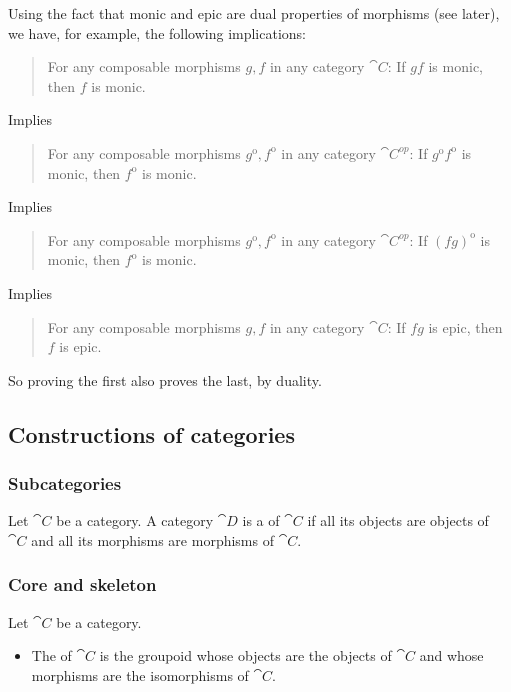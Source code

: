 \begin{example}
Using the fact that monic and epic are dual properties of morphisms (see later), we have, for example, the following implications:
\begin{quote}
For any composable morphisms $g,f$ in any category $\cat{C}$: If $gf$ is monic, then $f$ is monic.
\end{quote}
Implies
\begin{quote}
For any composable morphisms $g^\text{o},f^\text{o}$ in any category $\cat{C^{op}}$: If $g^\text{o}f^\text{o}$ is monic, then $f^\text{o}$ is monic.
\end{quote}
Implies
\begin{quote}
For any composable morphisms $g^\text{o},f^\text{o}$ in any category $\cat{C^{op}}$: If $(fg)^\text{o}$ is monic, then $f^\text{o}$ is monic.
\end{quote}
Implies
\begin{quote}
For any composable morphisms $g,f$ in any category $\cat{C}$: If $fg$ is epic, then $f$ is epic.
\end{quote}
So proving the first also proves the last, by duality.
\end{example}



\subsection{Constructions of categories}
\subsubsection{Subcategories}
\begin{definition}
Let $\cat{C}$ be a category. A category $\cat{D}$ is a  of $\cat{C}$ if all its objects are objects of $\cat{C}$ and all its morphisms are morphisms of $\cat{C}$.
\end{definition}

\subsubsection{Core and skeleton}
\begin{definition}
Let $\cat{C}$ be a category.
\begin{itemize}
\item The  of $\cat{C}$ is the groupoid whose objects are the objects of $\cat{C}$ and whose morphisms are the isomorphisms of $\cat{C}$.
\end{itemize}
\end{definition}

